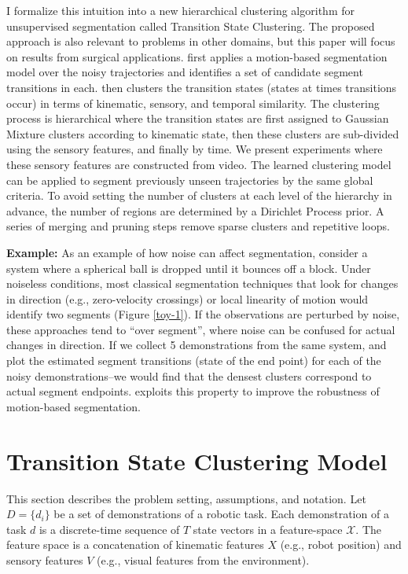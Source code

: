 I formalize this intuition into a new hierarchical clustering algorithm for unsupervised segmentation called Transition State Clustering.
The proposed approach is also relevant to problems in other domains, but this paper will focus on results from surgical applications.
\tsc first applies a motion-based segmentation model over the noisy trajectories and identifies a set of candidate segment transitions in each.
\tsc then clusters the transition states (states at times transitions occur) in terms of kinematic, sensory, and temporal similarity. 
The clustering process is hierarchical where the transition states are first assigned to Gaussian Mixture clusters according to kinematic state, then these clusters are sub-divided using the sensory features, and finally by time.
We present experiments where these sensory features are constructed from video.
The learned clustering model can be applied to segment previously unseen trajectories by the same global criteria.
To avoid setting the number of clusters at each level of the hierarchy in advance, the number of regions are determined by a Dirichlet Process prior.
A series of merging and pruning steps remove sparse clusters and repetitive loops.


\vspace{0.5em}

\noindent \textbf{Example: } As an example of how noise can affect segmentation, consider a system where a spherical ball is dropped until it bounces off a block.
Under noiseless conditions, most classical segmentation techniques that look for changes in direction (e.g., zero-velocity crossings) or local linearity of motion would identify two segments (Figure \ref{toy-1}).
If the observations are perturbed by noise, these approaches tend to ``over segment'', where noise can be confused for actual changes in direction.
If we collect 5 demonstrations from the same system, and
plot the estimated segment transitions (state of the end point) for each of the noisy demonstrations--we would find that the densest clusters correspond to actual segment endpoints.
\tsc exploits this property to improve the robustness of motion-based segmentation.


\section{Transition State Clustering Model}
This section describes the problem setting, assumptions, and notation.
Let $D=\{d_i\}$ be a set of demonstrations of a robotic task.
Each demonstration of a task $d$ is a discrete-time sequence of $T$ state vectors in a feature-space $\mathcal{X}$.
The feature space is a concatenation of kinematic features $X$ (e.g., robot position) and sensory features $V$ (e.g., visual features from the environment).

